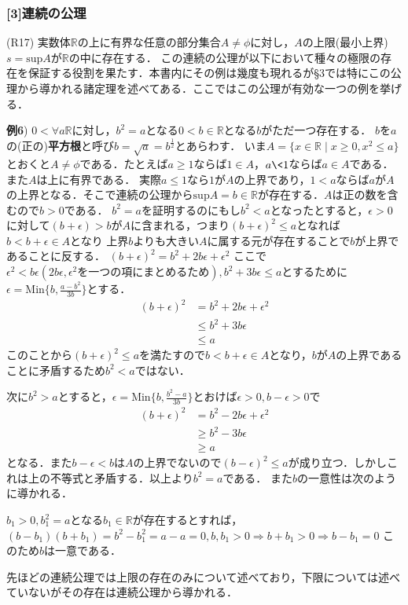 \documentclass{ltjsarticle}
\theoremstyle{definition}
\theoremstyle{propcorollarystyle}
\theoremstyle{thmcorollarystyle}
\begin{document}
\subsubsection*{[3]連続の公理}
 (R17) 実数体$\mathbb{R}$の上に有界な任意の部分集合$A \neq \phi$に対し，$A$の上限(最小上界)$s = \text{sup}A$が$\mathbb{R}$の中に存在する．
この連続の公理が以下において種々の極限の存在を保証する役割を果たす．本書内にその例は幾度も現れるが\S3では特にこの公理から導かれる諸定理を述べてある．ここではこの公理が有効な一つの例を挙げる．\par
 \textbf{例6}) $0 < \forall a \mathbb{R}$に対し，$b^{2}=a$となる$0 < b \in \mathbb{R}$となる$b$がただ一つ存在する．
$b$を$a$の(正の)\textbf{平方根}と呼び$b=\sqrt{a}=b^{\frac{1}{2}}$とあらわす．
 いま$A=\{x \in \mathbb{R} \mid x \ge 0, x^{2} \le a \}$とおくと$A \neq \phi$である．たとえば$a \ge 1$ならば$1 \in A$，$a \< 1$ならば$a \in A$である．
また$A$は上に有界である．
実際$a \le 1$なら$1$が$A$の上界であり，$1 < a$ならば$a$が$A$の上界となる．そこで連続の公理から$\text{sup}A=b \in \mathbb{R}$が存在する．$A$は正の数を含むので$b>0$である．
$b^{2}=a$を証明するのにもし$b^{2}<a$となったとすると，$\epsilon > 0$に対して$(b+\epsilon)>b$が$A$に含まれる，つまり$(b+\epsilon)^{2}\le a$となれば$b < b+\epsilon  \in A$となり
上界$b$よりも大きい$A$に属する元が存在することで$b$が上界であることに反する．
$(b+\epsilon)^{2}=b^{2}+2b\epsilon+\epsilon^{2}$
ここで$\epsilon^{2} < b\epsilon(2b\epsilon, \epsilon^{2}\text{を一つの項にまとめるため}), b^{2}+3b\epsilon \le a$とするために
$\epsilon = \text{Min} \{b, \frac{a-b^{2}}{3b}\}$とする．
\begin{align*}
  (b+\epsilon)^{2}&=b^{2}+2b\epsilon+\epsilon^{2}\\
  &\le b^{2}+3b\epsilon\\
  &\le a
\end{align*}
このことから$(b+\epsilon)^{2} \le a$を満たすので$b < b+ \epsilon \in A$となり，$b$が$A$の上界であることに矛盾するため$b^{2} <a$ではない．\par
次に$b^{2} > a$とすると，$\epsilon = \text{Min}\{b, \frac{b^{2}-a}{3b}\}$とおけば$\epsilon > 0, b-\epsilon > 0$で
\begin{align*}
  (b+\epsilon)^{2} &= b^{2}-2b\epsilon+\epsilon^{2}\\
  &\ge b^{2}-3b\epsilon\\
  &\ge a
\end{align*}
となる．また$b-\epsilon<b$は$A$の上界でないので$(b-\epsilon)^{2} \le a$が成り立つ．しかしこれは上の不等式と矛盾する．以上より$b^{2}=a$である．
また$b$の一意性は次のように導かれる．\par
$b_1 > 0, b_1^{2}=a$となる$b_1 \in \mathbb{R}$が存在するとすれば，
$(b-b_1)(b+b_1)=b^{2}-b_1^{2}=a-a=0, b,b_1>0\Rightarrow b+b_1>0 \Rightarrow b-b_1=0$
このため$b$は一意である．\par
 先ほどの連続公理では上限の存在のみについて述べており，下限については述べていないがその存在は連続公理から導かれる．
\end{document}
